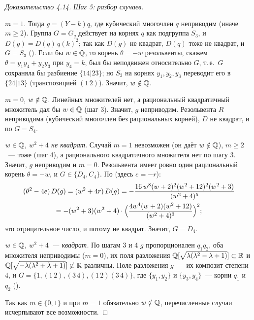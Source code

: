 \begin{proof}[Доказательство 4.14]
\emph{Шаг 5: разбор случаев.}

\emph{$m=1$.} Тогда $g=(Y-k)q$, где кубический многочлен $q$ неприводим (иначе $m\ge2$). Группа $G=G_q$ действует на корнях
$q$ как подгруппа $S_3$, и $D(g)=D(q)\,q(k)^2$; так как $D(g)$ не квадрат, $D(q)$ тоже не квадрат, и $G=S_3$ (). Если бы $w\in\mathbb Q$,
то корень $\theta=-w$ резольвенты, скажем $\theta=y_1y_4+y_2y_3$ при $y_4=k$, был бы неподвижен относительно $G$, т.\,е.\ $G$ сохраняла
бы разбиение $\{14|23\}$; но $S_3$ на корнях $y_1,y_2,y_3$ переводит его в $\{24|13\}$ (транспозицией $(1\,2)$). Значит, $w\notin\mathbb Q$.

\emph{$m=0$, $w\notin\mathbb Q$.} Линейных множителей нет, а рациональный квадратичный множитель дал бы $w\in\mathbb Q$ (шаг 3). Значит, $g$
неприводим. Резольвента $R$ неприводима (кубический многочлен без рациональных корней), $D$ не квадрат, и по  $G=S_4$.

\emph{$w\in\mathbb Q$, $w^2+4$ не квадрат.} Случай $m=1$ невозможен (он даёт $w\notin\mathbb Q$), $m\ge2$~--- тоже (шаг 4), а рационального
квадратичного множителя нет по шагу 3. Значит, $g$ неприводим и $m=0$. Резольвента имеет ровно один рациональный корень $\theta=-w$, и $G\in\{D_4,C_4\}$. По 
(здесь $e=-r$):
\begin{multline*}
(\theta^2-4e)\,D(g)=(w^2+4r)\,D(g)=-\frac{16\,w^8(w+2)^2(w^2+12)^2(w^2+3)}{(w^2+4)^5}\\
=-(w^2+3)(w^2+4)\cdot\Bigl(\frac{4w^4(w+2)(w^2+12)}{(w^2+4)^3}\Bigr)^2 ;
\end{multline*}
это отрицательное число, и потому не квадрат. Значит, $G=D_4$.

\emph{$w\in\mathbb Q$, $w^2+4$~--- квадрат.} По шагам 3 и 4 $g$ пропорционален $q_1q_2$, оба множителя неприводимы ($m=0$), их поля
разложения $\mathbb Q[\sqrt{\lambda(\lambda^2-\lambda+1)}]\subset\mathbb R$ и $\mathbb Q[\sqrt{-\lambda(\lambda^2+\lambda+1)}]\not\subset\mathbb R$ различны. Поле разложения $g$~---
их композит степени $4$, и $G=\{1,(1\,2),(3\,4),(1\,2)(3\,4)\}$, где $\{y_1,y_2\}$ и $\{y_3,y_4\}$~--- корни $q_1$ и $q_2$ ().

Так как $m\in\{0,1\}$ и при $m=1$ обязательно $w\notin\mathbb Q$, перечисленные случаи исчерпывают все возможности.
\end{proof}

